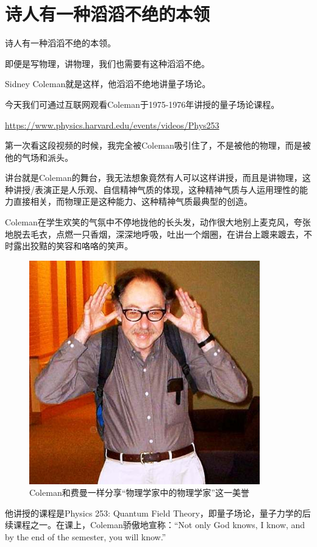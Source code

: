 \section{诗人有一种滔滔不绝的本领}

诗人有一种滔滔不绝的本领。

即便是写物理，讲物理，我们也需要有这种滔滔不绝。

Sidney Coleman就是这样，他滔滔不绝地讲量子场论。

今天我们可通过互联网观看Coleman于1975-1976年讲授的量子场论课程。

\url{https://www.physics.harvard.edu/events/videos/Phys253}

第一次看这段视频的时候，我完全被Coleman吸引住了，不是被他的物理，而是被他的气场和派头。

讲台就是Coleman的舞台，我无法想象竟然有人可以这样讲授，而且是讲物理，这种讲授/表演正是人乐观、自信精神气质的体现，这种精神气质与人运用理性的能力直接相关，而物理正是这种能力、这种精神气质最典型的创造。

Coleman在学生欢笑的气氛中不停地拢他的长头发，动作很大地别上麦克风，夸张地脱去毛衣，点燃一只香烟，深深地呼吸，吐出一个烟圈，在讲台上踱来踱去，不时露出狡黠的笑容和咯咯的笑声。

\begin{figure}[htbp]
\begin{center}
\includegraphics[width=10cm]{Appendix/Scoleman1.jpg}
\caption{Coleman和费曼一样分享“物理学家中的物理学家”这一美誉}
\end{center}
\end{figure}

他讲授的课程是Physics 253: Quantum Field Theory，即量子场论，量子力学的后续课程之一。在课上，Coleman骄傲地宣称：“Not only God knows, I know, and by the end of the semester, you will know.”

